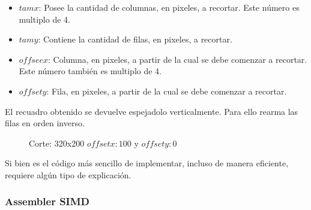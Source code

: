 \begin{itemize}
\item{$tamx$: Posee la cantidad de columnas, en pixeles, a recortar. Este número es multiplo de 4.}
\item{$tamy$: Contiene la cantidad de filas, en pixeles, a recortar.}
\item{$offseex$: Columna, en pixeles, a partir de la cual se debe comenzar a recortar. Este número también es multiplo de 4.}
\item{$offsety$: Fila, en pixeles, a partir de la cual se debe comenzar a recortar.}
\end{itemize}

El recuadro obtenido se devuelve espejadolo verticalmente. Para ello rearma las filas en orden inverso.\\

\newpage

\begin{figure}[h]
  \centering
  \hfill
  \caption{Corte: 320x200 $offset x: 100$ y $offset y: 0$}
\end{figure}

Si bien es el código más sencillo de implementar, incluso de manera eficiente, requiere algún tipo de explicación.

\subsubsection{Assembler SIMD}

